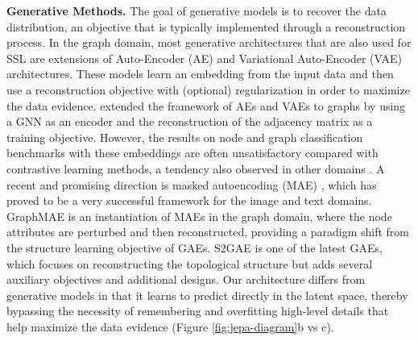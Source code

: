 \documentclass{article} \usepackage{iclr2024_conference,times}
\begin{document}
\textbf{Generative Methods.} The goal of generative models is to recover the data distribution, an objective that is typically implemented through a reconstruction process. In the graph domain, most generative architectures that are also used for SSL are extensions of Auto-Encoder (AE) \citep{hinton1993autoencoders} and Variational Auto-Encoder (VAE) \citep{kingma2013auto} architectures. These models learn an embedding from the input data and then use a reconstruction objective with (optional) regularization in order to maximize the data evidence. \citet{kipf2016variational} extended the framework of AEs and VAEs to graphs by using a GNN as an encoder and the reconstruction of the adjacency matrix as a training objective. However, the results on node and graph classification benchmarks with these embeddings are often unsatisfactory compared with contrastive learning methods, a tendency also observed in other domains \citep{liu2023sslsurvey}. A recent and promising direction is masked autoencoding (MAE) \citep{he2022masked}, which has proved to be a very successful framework for the image and text domains. GraphMAE \citep{hou2022graphmae} is an instantiation of MAEs in the graph domain, where the node attributes are perturbed and then reconstructed, providing a paradigm shift from the structure learning objective of GAEs. S2GAE \citep{tan2023s2gae} is one of the latest GAEs, which focuses on reconstructing the topological structure but adds several auxiliary objectives and additional designs. Our architecture differs from generative models in that it learns to predict directly in the latent space, thereby bypassing the necessity of remembering and overfitting high-level details that help maximize the data evidence (Figure \ref{fig:jepa-diagram}b vs c).
\end{document}
